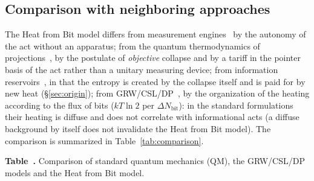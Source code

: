 \documentclass[11pt,a4paper]{article}
\newcommand{\Sref}[1]{\hyperref[#1]{\S\ref{#1}}}
\begin{document}
\subsection{Comparison with neighboring approaches}\label{sec:compare}

The Heat from Bit model differs from measurement engines~\cite{elouard2017,elouard2018,yi2017,bresque2021,dassonneville2026,nogo2026} by the autonomy of the act without an apparatus; from the quantum thermodynamics of projections~\cite{kammerlander2016}, by the postulate of \emph{objective} collapse and by a tariff in the pointer basis of the act rather than a unitary measuring device; from information reservoirs~\cite{mandal2012,mandal2013,deffner2013,ptaszynski2019}, in that the entropy is created by the collapse itself and is paid for by new heat (\Sref{sec:origin}); from GRW/CSL/DP~\cite{bassi2013}, by the organization of the heating according to the flux of bits ($kT\ln 2$ per $\Delta N_{\mathrm{bit}}$): in the standard formulations their heating is diffuse and does not correlate with informational acts (a diffuse background by itself does not invalidate the Heat from Bit model). The comparison is summarized in Table~\ref{tab:comparison}.

\vspace{0.4em}
\noindent\begin{minipage}{\textwidth}
\noindent{}\label{tab:comparison}%
{\centering
\textbf{Table~\thetable.} Comparison of standard quantum mechanics (QM), the GRW/CSL/DP models and the Heat from Bit model.\par\vspace{0.25em}
{\footnotesize
\setlength{\tabcolsep}{3pt}
\renewcommand{\arraystretch}{1.12}
}
\par}
\end{minipage}
\vspace{0.6em}
\end{document}
